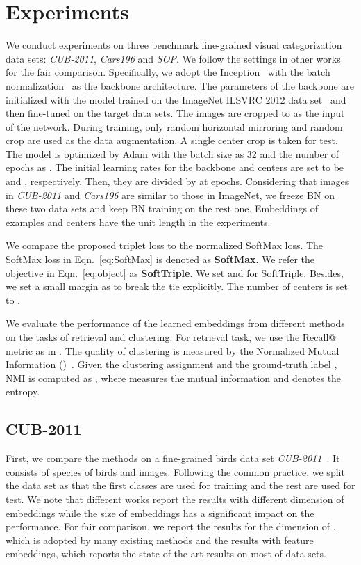 \documentclass[10pt,twocolumn,letterpaper]{article}
\begin{document}
\section{Experiments}
\label{sec:exp}
We conduct experiments on three benchmark fine-grained visual categorization data sets: \textit{CUB-2011}, \textit{Cars196} and \textit{SOP}. We follow the settings in other works~\cite{GeHDS18,Attias17} for the fair comparison. Specifically, we adopt the Inception~\cite{SzegedyLJSRAEVR15} with the batch normalization~\cite{IoffeS15} as the backbone architecture. The parameters of the backbone are initialized with the model trained on the ImageNet ILSVRC 2012 data set~\cite{ILSVRC15} and then fine-tuned on the target data sets. The images are cropped to  as the input of the network. During training, only random horizontal mirroring and random crop are used as the data augmentation. A single center crop is taken for test. The model is optimized by Adam with the batch size as 32 and the number of epochs as . The initial learning rates for the backbone and centers are set to be  and , respectively. Then, they are divided by  at  epochs. Considering that images in \textit{CUB-2011} and \textit{Cars196} are similar to those in ImageNet, we freeze BN on these two data sets and keep BN training on the rest one. Embeddings of examples and centers have the unit length in the experiments.

We compare the proposed triplet loss to the normalized SoftMax loss. The SoftMax loss in Eqn.~\ref{eq:SoftMax} is denoted as \textbf{SoftMax}. We refer the objective in Eqn.~\ref{eq:object} as \textbf{SoftTriple}. We set  and  for SoftTriple. Besides, we set a small margin as  to break the tie explicitly. The number of centers is set to .

We evaluate the performance of the learned embeddings from different methods on the tasks of retrieval and clustering. For retrieval task, we use the Recall@ metric as in \cite{SongXJS16}. The quality of clustering is measured by the Normalized Mutual Information ()~\cite{manning2010}. Given the clustering assignment  and the ground-truth label , NMI is computed as
, where  measures the mutual information and  denotes the entropy.

\subsection{CUB-2011}
First, we compare the methods on a fine-grained birds data set \textit{CUB-2011}~\cite{WahCUB_200_2011}. It consists of  species of birds and  images. Following the common practice, we split the data set as that the first  classes are used for training and the rest are used for test. We note that different works report the results with different dimension of embeddings while the size of embeddings has a significant impact on the performance. For fair comparison, we report the results for the dimension of , which is adopted by many existing methods and the results with  feature embeddings, which reports the state-of-the-art results on most of data sets. 
\end{document}
